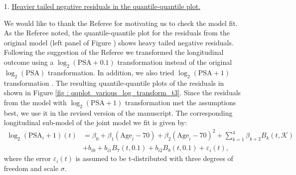 \begin{enumerate}
    \item [1.] \underline{Heavier tailed negative residuals in the quantile-quantile plot.}

    We would like to thank the Referee for motivating us to check the model fit. As the Referee noted, the quantile-quantile plot for the residuals from the original model (left panel of Figure ) shows heavy tailed negative residuals. Following the suggestion of the Referee we transformed the longitudinal outcome using a $\log_2 (\mbox{PSA}+0.1)$ transformation instead of the original $\log_2 (\mbox{PSA})$ transformation. In addition, we also tried $\log_2 (\mbox{PSA}+1)$ transformation \citep{lin2000latent,pearson1994mixed}. The resulting quantile-quantile plots of the residuals in shown in Figure \ref{fig : qqplot_various_log_transform_t3}. Since the residuals from the model with $\log_2(\mbox{PSA} + 1)$ transformation met the assumptions best, we use it in the revised version of the manuscript. The corresponding longitudinal sub-model of the joint model we fit is given by:
    \begin{equation}
    \label{eq : long_model_prias_ref2}
    \begin{aligned}
\log_2 (\mbox{PSA}_i + 1)(t) &= \beta_0 + \beta_1 (\mbox{Age}_i-70) + \beta_2 (\mbox{Age}_i-70)^2 + \sum_{k=1}^4 \beta_{k+2} B_k(t,\mathcal{K})\\ 
&+  b_{i0} + b_{i1} B_7(t, 0.1) + b_{i2} B_8(t, 0.1) +
\varepsilon_i(t),
\end{aligned}
\end{equation}
    where the error $\varepsilon_i(t)$ is assumed to be t-distributed with three degrees of freedom and scale $\sigma$.


\end{enumerate}
